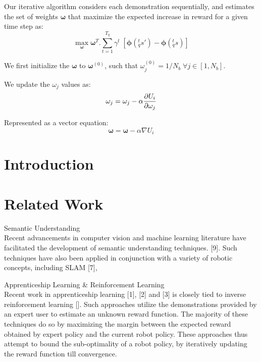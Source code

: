 Our iterative algorithm considers each demonstration sequentially, and estimates the set of weights $\bm{\omega}$ that maximize the expected increase in reward for a given time step as: 
$$\max_{\bm{\omega}} \bm{\omega}^T. \sum_{t=1}^{T_q} \gamma^t \; [ \bm{\phi}(_q^ts') - \bm{\phi}(_q^ts) ]$$

We first initialize the $\bm{\omega}$ to $\bm{\omega}^{(0)}$, such that $\omega_j^{(0)} = 1/{N_b} \; \forall j \in [1,N_b]$. 

We update the $\omega_j$ values as: 
\begin{equation}
\omega_j = \omega_j - \alpha {{\partial U_i}\over{\partial \omega_j}}
\end{equation}

Represented as a vector equation: 
\begin{equation}
\bm{\omega} = \bm{\omega} - \alpha \nabla U_i
\end{equation}


\section{Introduction}

\section{Related Work}
\noindent
Semantic Understanding\\

\noindent
Recent advancements in computer vision and machine learning literature have facilitated the development of semantic understanding techniques. [9]. Such techniques have also been applied in conjunction with a variety of robotic concepts, including SLAM [7], 

\noindent
Apprenticeship Learning \& Reinforcement Learning\\

\noindent
Recent work in apprenticeship learning [1], [2] and [3] is closely tied to inverse reinforcement learning []. Such approaches utilize the demonstrations provided by an expert user to estimate an unknown reward function. The majority of these techniques do so by maximizing the margin between the expected reward obtained by expert policy and the current robot policy. These approaches thus attempt to bound the sub-optimality of a robot policy, by iteratively updating the reward function till convergence. \\

